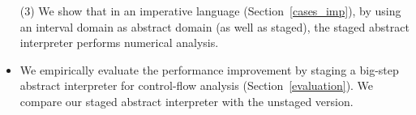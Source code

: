\begin{itemize}
    \subitem (3) We show that in an imperative language
    (Section~\ref{cases_imp}), by using an interval domain as abstract domain
    (as well as staged), the staged abstract interpreter performs numerical 
    analysis.
    
  \item We empirically evaluate the performance improvement by staging a
    big-step abstract interpreter for control-flow analysis
    (Section~\ref{evaluation}). We compare our staged abstract interpreter with the
    unstaged version.
\end{itemize}
